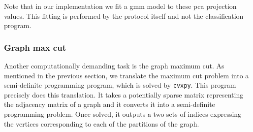 \documentclass[../main.tex]{subfiles}
\begin{document}
Note that in our implementation we fit a \gls{gmm} model to these \gls{pca} projection values. This fitting is performed by the protocol itself and not the classification program. 

\subsubsection{Graph max cut}
Another computationally demanding task is the graph maximum cut. As mentioned in the previous section, we translate the maximum cut problem into a semi-definite programming program, which is solved by \texttt{cvxpy}. This program precisely does this translation. It takes a potentially sparse matrix representing the adjacency matrix of a graph and it converts it into a semi-definite programming problem. Once solved, it outputs a two sets of indices expressing the vertices corresponding to each of the partitions of the graph.
\end{document}
